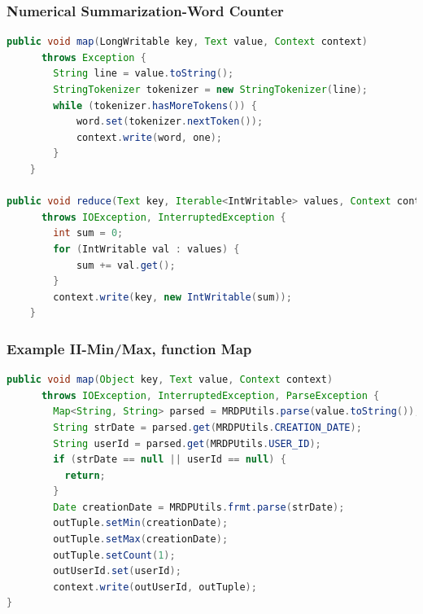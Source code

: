 \documentclass[xcolor=dvipsnames,dvip,notes=show,table]{beamer}
\begin{document}
\begin{frame}[fragile]
  \frametitle{Numerical Summarization-Word Counter}

\begin{lstlisting}[language=Java]
public void map(LongWritable key, Text value, Context context) 
      throws Exception {
        String line = value.toString();
        StringTokenizer tokenizer = new StringTokenizer(line);
        while (tokenizer.hasMoreTokens()) {
            word.set(tokenizer.nextToken());
            context.write(word, one);
        }
    }
    
public void reduce(Text key, Iterable<IntWritable> values, Context context) 
      throws IOException, InterruptedException {
        int sum = 0;
        for (IntWritable val : values) {
            sum += val.get();
        }
        context.write(key, new IntWritable(sum));
    }    
\end{lstlisting}

\end{frame}




\begin{frame}[fragile]
  \frametitle{Example II-Min/Max, function Map}

\begin{lstlisting}[language=Java]
public void map(Object key, Text value, Context context)
      throws IOException, InterruptedException, ParseException {
        Map<String, String> parsed = MRDPUtils.parse(value.toString());
        String strDate = parsed.get(MRDPUtils.CREATION_DATE);
        String userId = parsed.get(MRDPUtils.USER_ID);
        if (strDate == null || userId == null) {
          return;
        }
        Date creationDate = MRDPUtils.frmt.parse(strDate);
        outTuple.setMin(creationDate);
        outTuple.setMax(creationDate);
        outTuple.setCount(1);
        outUserId.set(userId);
        context.write(outUserId, outTuple);
}
\end{lstlisting}

\end{frame}
\end{document}

